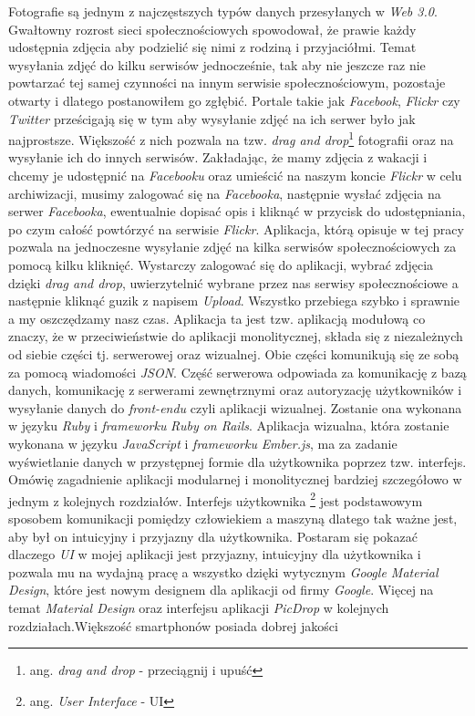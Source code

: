 \documentclass[openright]{xmgr}
\begin{document}
\maketitle
%
\introduction
\indent Fotografie są jednym z najczęstszych typów danych przesyłanych w \textit{Web 3.0}. Gwałtowny rozrost sieci społecznościowych spowodował, że prawie każdy udostępnia zdjęcia aby podzielić się nimi z rodziną i przyjaciółmi. Temat wysyłania zdjęć do kilku serwisów jednocześnie, tak aby nie jeszcze raz nie powtarzać tej samej czynności na innym serwisie społecznościowym, pozostaje otwarty i dlatego postanowiłem go zgłębić.
\newline\indent Portale takie jak \textit{Facebook}, \textit{Flickr} czy \textit{Twitter} prześcigają się w tym aby wysyłanie zdjęć na ich serwer było jak najprostsze. Większość z nich pozwala na tzw. \textit{drag and drop}\footnote{ang. \textit{drag and drop} - przeciągnij i upuść} fotografii oraz na wysyłanie ich do innych serwisów. Zakładając, że mamy zdjęcia z wakacji i chcemy je udostępnić na \textit{Facebooku} oraz umieścić na naszym koncie \textit{Flickr} w celu archiwizacji, musimy zalogować się na \textit{Facebooka}, następnie wysłać zdjęcia na serwer \textit{Facebooka}, ewentualnie dopisać opis i kliknąć w przycisk do udostępniania, po czym całość powtórzyć na serwisie \textit{Flickr}. Aplikacja, którą opisuje w tej pracy pozwala na jednoczesne wysyłanie zdjęć na kilka serwisów społecznościowych za pomocą kilku kliknięć. Wystarczy zalogować się do aplikacji, wybrać zdjęcia dzięki \textit{drag and drop}, uwierzytelnić  wybrane przez nas serwisy społecznościowe a następnie kliknąć guzik z napisem \textit{Upload}. Wszystko przebiega szybko i sprawnie a my oszczędzamy nasz czas. Aplikacja ta jest tzw. aplikacją modułową co znaczy, że w przeciwieństwie do aplikacji monolitycznej, składa się z  niezależnych od siebie części tj. serwerowej oraz wizualnej. Obie części komunikują się ze sobą za pomocą wiadomości \textit{JSON}. Część serwerowa odpowiada za komunikację z bazą danych, komunikację z serwerami zewnętrznymi oraz autoryzację użytkowników i wysyłanie danych do \textit{front-endu} czyli aplikacji wizualnej. Zostanie ona wykonana w języku \textit{Ruby} i \textit{frameworku} \textit{Ruby on Rails}.   Aplikacja wizualna, która zostanie wykonana w języku \textit{JavaScript} i \textit{frameworku} \textit{Ember.js}, ma za zadanie wyświetlanie danych w przystępnej formie dla użytkownika poprzez tzw. interfejs. Omówię zagadnienie aplikacji modularnej i monolitycznej bardziej szczegółowo w jednym z kolejnych rozdziałów. Interfejs użytkownika \footnote{ang. \textit{User Interface} - UI}  jest podstawowym sposobem komunikacji pomiędzy człowiekiem a maszyną dlatego tak ważne jest, aby był on intuicyjny i przyjazny dla użytkownika. Postaram się pokazać dlaczego \textit{UI} w mojej aplikacji jest przyjazny, intuicyjny dla użytkownika i pozwala mu na wydajną pracę a wszystko dzięki wytycznym \textit{Google Material Design}, które jest nowym designem dla aplikacji od firmy \textit{Google}. Więcej na temat \textit{Material Design} oraz interfejsu aplikacji \textit{PicDrop} w kolejnych rozdziałach.\newline \indent Większość smartphonów posiada dobrej jakości 
\end{document}
